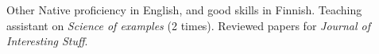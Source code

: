 \begin{rubric}{Other}
\entry*[Languages]
	Native proficiency in English, and good skills in Finnish.
%
\entry*[Teaching]
	Teaching assistant on \emph{Science of examples} (2 times).
%
    Reviewed papers for \emph{Journal of Interesting Stuff}.
\end{rubric}
